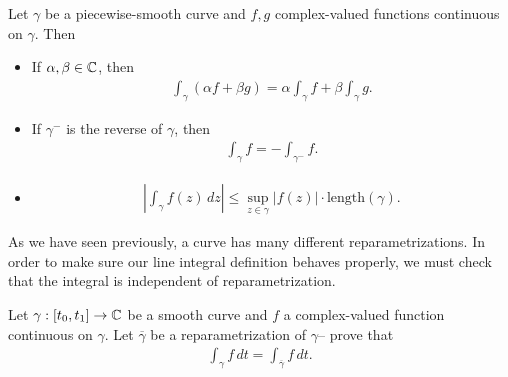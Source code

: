 \documentclass{memoir}
\begin{document}
\begin{prop}
	Let \(\gamma\) be a piecewise-smooth curve and \(f,g\) complex-valued functions continuous on \(\gamma \). Then
	\begin{itemize}
		\item If \(\alpha ,\beta  \in \mathbb{C}\), then
			\begin{align*}
				\int _{\gamma }(\alpha f + \beta g) = \alpha \int_{\gamma }f + \beta \int_{\gamma }g.
			\end{align*}
		\item If \(\gamma^{-}\) is the reverse of \(\gamma \), then
			\begin{align*}
				\int_\gamma f = - \int_{\gamma^{-}}f.
			\end{align*}
		\item 
			\begin{align*}
				\left| \int_\gamma f(z) \,d z \right| \leq \sup_{z \in \gamma } \left| f(z) \right| \cdot \textrm{length}(\gamma ).
			\end{align*}
	\end{itemize}
\end{prop}

As we have seen previously, a curve has many different reparametrizations. In order to make sure our line integral definition behaves properly, we must check that the integral is independent of reparametrization.

\begin{hw}
	Let \(\gamma:[t_0,t_1] \to \mathbb{C}\) be a smooth curve and \(f\) a complex-valued function continuous on \(\gamma \). Let \(\overline{\gamma }\) be a reparametrization of \(\gamma \)-- prove that
	\begin{align*}
		\int_{\gamma }f \,d t = \int_{\overline{\gamma }}f \,d t.
	\end{align*}
\end{hw}
\end{document}
